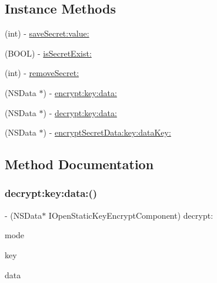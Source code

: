 \subsection*{Instance Methods}
\begin{DoxyCompactItemize}
\item 
(int) -\/ \mbox{\hyperlink{protocol_i_open_static_key_encrypt_component_01-p_affdd20bcddb0a63f5001df8d18443aa1}{save\+Secret\+:value\+:}}
\item 
(B\+O\+OL) -\/ \mbox{\hyperlink{protocol_i_open_static_key_encrypt_component_01-p_aee7dd20f6207eaa1913f483a97894eed}{is\+Secret\+Exist\+:}}
\item 
(int) -\/ \mbox{\hyperlink{protocol_i_open_static_key_encrypt_component_01-p_adda2a40b5b5aaabbf9c574f100883453}{remove\+Secret\+:}}
\item 
(N\+S\+Data $\ast$) -\/ \mbox{\hyperlink{protocol_i_open_static_key_encrypt_component_01-p_a30c3048e42624cffc4c0ebddbe1efb28}{encrypt\+:key\+:data\+:}}
\item 
(N\+S\+Data $\ast$) -\/ \mbox{\hyperlink{protocol_i_open_static_key_encrypt_component_01-p_a93cf7d6c8fa5dc13c5536766146c2105}{decrypt\+:key\+:data\+:}}
\item 
(N\+S\+Data $\ast$) -\/ \mbox{\hyperlink{protocol_i_open_static_key_encrypt_component_01-p_a2421c129a9a1c54ddbe92e2d1deeb758}{encrypt\+Secret\+Data\+:key\+:data\+Key\+:}}
\end{DoxyCompactItemize}


\subsection{Method Documentation}
\mbox{\label{protocol_i_open_static_key_encrypt_component_01-p_a93cf7d6c8fa5dc13c5536766146c2105}} 
\subsubsection{\texorpdfstring{decrypt\+:key\+:data\+:()}{decrypt:key:data:()}}
{\footnotesize\ttfamily -\/ (N\+S\+Data$\ast$ I\+Open\+Static\+Key\+Encrypt\+Component) decrypt\+: \begin{DoxyParamCaption}\item[{(N\+S\+Integer)}]{mode }\item[{key:(N\+S\+String $\ast$)}]{key }\item[{data:(N\+S\+Data $\ast$)}]{data }\end{DoxyParamCaption}}

